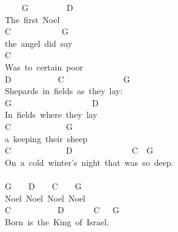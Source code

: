 \documentclass[]{book}
\begin{document}
~~~~G~~~~~~~~~D~~\\
The~first~Noel~\\
\hspace*{0.333em}\hspace*{0.333em}\hspace*{0.333em}\hspace*{0.333em}C~~~~~~~~~~~~G\\
the~angel~did~say~\\
\hspace*{0.333em}\hspace*{0.333em}\hspace*{0.333em}\hspace*{0.333em}\hspace*{0.333em}\hspace*{0.333em}\hspace*{0.333em}C\\
Was~to~certain~poor~\\
D~~~~~~~~~~~C~~~~~~~~~~~~~~G\\
Shepards~in~fields~as~they~lay:~\\
\hspace*{0.333em}\hspace*{0.333em}\hspace*{0.333em}G~~~~~~~~~~~~~~~~~~~D\\
In~fields~where~they~lay\\
\hspace*{0.333em}\hspace*{0.333em}C~~~~~~~~~~~~~G~\\
a~keeping~their~sheep\\
\hspace*{0.333em}\hspace*{0.333em}\hspace*{0.333em}\hspace*{0.333em}\hspace*{0.333em}C~~~~~~~~~~~~~D~~~~~~~~~~~~~~C~~G~~\\
On~a~cold~winter's~night~that~was~so~deep.\\
~\\
\hspace*{0.333em}\hspace*{0.333em}G~~~~D~~~~C~~~~G\\
Noel~Noel~Noel~Noel\\
C~~~~~~~~~~~D~~~~~~~C~~~G\\
Born~is~the~King~of~Israel.\\
\hspace*{0.333em}\\
\end{document}
